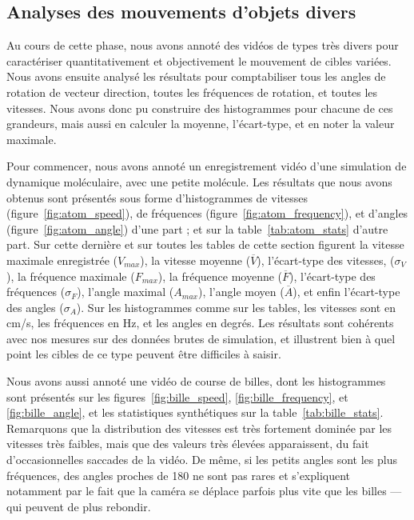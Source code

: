 	\subsection{Analyses des mouvements d'objets divers}
	Au cours de cette phase, nous avons annoté des vidéos de types très divers pour caractériser quantitativement et objectivement le mouvement de cibles variées. Nous avons ensuite analysé les résultats pour comptabiliser tous les angles de rotation de vecteur direction, toutes les fréquences de rotation, et toutes les vitesses. Nous avons donc pu construire des histogrammes pour chacune de ces grandeurs, mais aussi en calculer la moyenne, l'écart-type, et en noter la valeur maximale.
	
	Pour commencer, nous avons annoté un enregistrement vidéo d'une simulation de dynamique moléculaire, avec une petite molécule. Les résultats que nous avons obtenus sont présentés sous forme d'histogrammes de vitesses (figure~\ref{fig:atom_speed}), de fréquences (figure~\ref{fig:atom_frequency}), et d'angles (figure~\ref{fig:atom_angle}) d'une part ; et sur la table~\ref{tab:atom_stats} d'autre part. Sur cette dernière et sur toutes les tables de cette section figurent la vitesse maximale enregistrée ($V_{max}$), la vitesse moyenne ($\overline{V}$), l'écart-type des vitesses, ($\sigma_{V}$), la fréquence maximale ($F_{max}$), la fréquence moyenne ($\overline{F}$), l'écart-type des fréquences ($\sigma_{F}$), l'angle maximal ($A_{max}$), l'angle moyen ($\overline{A}$), et enfin l'écart-type des angles ($\sigma_{A}$). Sur les histogrammes comme sur les tables, les vitesses sont en cm/s, les fréquences en Hz, et les angles en degrés. Les résultats sont cohérents avec nos mesures sur des données brutes de simulation, et illustrent bien à quel point les cibles de ce type peuvent être difficiles à saisir.
	
	Nous avons aussi annoté une vidéo de course de billes, dont les histogrammes sont présentés sur les figures~\ref{fig:bille_speed}, \ref{fig:bille_frequency}, et \ref{fig:bille_angle}, et les statistiques synthétiques sur la table~\ref{tab:bille_stats}. Remarquons que la distribution des vitesses est très fortement dominée par les vitesses très faibles, mais que des valeurs très élevées apparaissent, du fait d'occasionnelles saccades de la vidéo. De même, si les petits angles sont les plus fréquences, des angles proches de 180\textdegree{} ne sont pas rares et s'expliquent notamment par le fait que la caméra se déplace parfois plus vite que les billes --- qui peuvent de plus rebondir.	
	
